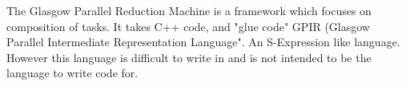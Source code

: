 The Glasgow Parallel Reduction Machine is a framework which focuses
on composition of tasks. It takes C++ code, and "glue code" GPIR (Glasgow
Parallel Intermediate Representation Language". An S-Expression like
language. However this language is difficult to write in and is not intended
to be the language to write code for.
